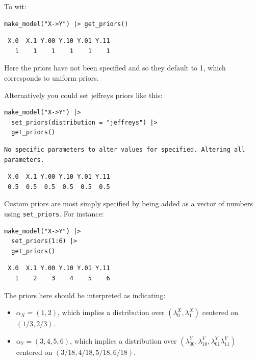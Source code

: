 \documentclass[
  article]{jss}
\providecommand{\tightlist}{%
  \setlength{\itemsep}{0pt}\setlength{\parskip}{0pt}}\usepackage{longtable,booktabs,array}
\begin{document}
To wit:

\begin{verbatim}
make_model("X->Y") |> get_priors()
\end{verbatim}

\begin{verbatim}
 X.0  X.1 Y.00 Y.10 Y.01 Y.11 
   1    1    1    1    1    1 
\end{verbatim}

Here the priors have not been specified and so they default to 1, which
corresponds to uniform priors.

Alternatively you could set jeffreys priors like this:

\begin{verbatim}
make_model("X->Y") |> 
  set_priors(distribution = "jeffreys") |> 
  get_priors()
\end{verbatim}

\begin{verbatim}
No specific parameters to alter values for specified. Altering all parameters.
\end{verbatim}

\begin{verbatim}
 X.0  X.1 Y.00 Y.10 Y.01 Y.11 
 0.5  0.5  0.5  0.5  0.5  0.5 
\end{verbatim}

Custom priors are most simply specified by being added as a vector of
numbers using \texttt{set\_priors}. For instance:

\begin{verbatim}
make_model("X->Y") |> 
  set_priors(1:6) |> 
  get_priors()
\end{verbatim}

\begin{verbatim}
 X.0  X.1 Y.00 Y.10 Y.01 Y.11 
   1    2    3    4    5    6 
\end{verbatim}

The priors here should be interpreted as indicating:

\begin{itemize}
\tightlist
\item
  \(\alpha_X = (1,2)\), which implies a distribution over
  \((\lambda^X_0, \lambda^X_1)\) centered on \((1/3, 2/3)\).
\item
  \(\alpha_Y = (3,4,5,6)\), which implies a distribution over
  \((\lambda^Y_{00}, \lambda^Y_{10}, \lambda^Y_{01} \lambda^Y_{11})\)
  centered on \((3/18, 4/18, 5/18, 6/18)\).
\end{itemize}
\end{document}
